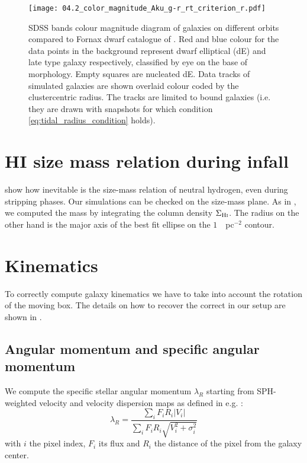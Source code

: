 \begin{sidewaysfigure}
\centering
\texttt{[image: 04.2\_color\_magnitude\_Aku\_g-r\_rt\_criterion\_r.pdf]}
\caption{SDSS bands colour magnitude diagram of galaxies on different orbits compared to Fornax dwarf catalogue of \citet{Venhola2019}.
Red and blue colour for the data points in the background represent dwarf elliptical (dE) and late type galaxy respectively, classified by eye on the base of morphology. Empty squares are nucleated dE.
Data tracks of simulated galaxies are shown overlaid colour coded by the clustercentric radius.
The tracks are limited to bound galaxies (i.e. they are drawn with snapshots for which condition \eqref{eq:tidal_radius_condition} holds).
}
\label{fig:g-r}
\end{sidewaysfigure}

\section{HI size mass relation during infall}
\citet{Stevens2019} show how inevitable is the size-mass relation of neutral hydrogen, even during stripping phases.
Our simulations can be checked on the size-mass plane.
As in \citet{Verbeke2017}, we computed the \Hi{} mass by integrating the \Hi{} column density $\Sigma_{\text{H\textsc{i}}}$. The radius on the other hand is the major axis of the best fit ellipse on the $1$~\Msun{}~pc$^{-2}$ contour.


\section{Kinematics}
To correctly compute galaxy kinematics we have to take into account the rotation of the moving box.
The details on how to recover the correct in our setup are shown in .

\subsection{Angular momentum and specific angular momentum}
We compute the specific stellar angular momentum $\lambda_R$ starting from SPH-weighted velocity and velocity dispersion maps as defined in e.g. \citet{Toloba2015}: %
\begin{equation}
    \lambda_R = \dfrac{\sum_i F_i R_i |V_i|}{\sum_i F_i R_i \sqrt{V_i^2 + \sigma_i^2}}
\end{equation}
with $i$ the pixel index, $F_i$ its flux and $R_i$ the distance of the pixel from the galaxy center.

